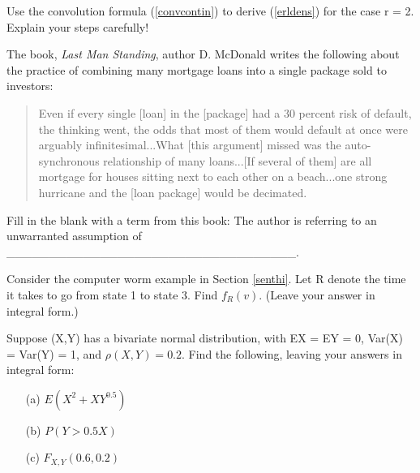 \oneproblem
Use the convolution formula (\ref{convcontin}) to derive (\ref{erldens})
for the case r = 2. Explain your steps carefully!

\oneproblem
The book, {\it Last Man Standing}, author D. McDonald writes
the following about the practice of combining many mortgage loans into a
single package sold to investors:

\begin{quote}
Even if every single [loan] in the [package] had a 30 percent risk of
default, the thinking went, the odds that most of them would default at
once were arguably infinitesimal...What [this argument] missed was the
auto-synchronous relationship of many loans...[If several of them] are
all mortgage for houses sitting next to each other on a beach...one
strong hurricane and the [loan package] would be decimated.
\end{quote}

Fill in the blank with a term from this book:  The author is referring
to an unwarranted assumption of
\_\_\_\_\_\_\_\_\_\_\_\_\_\_\_\_\_\_\_\_\_\_\_\_\_\_\_\_\_\_\_\_\_\_.

\oneproblem
Consider the computer worm example in Section \ref{senthi}.  Let R
denote the time it takes to go from state 1 to state 3.  Find $f_R(v)$.
(Leave your answer in integral form.)

\oneproblem
Suppose (X,Y) has a bivariate normal distribution, with EX = EY = 0,
Var(X) = Var(Y) = 1, and $\rho(X,Y) = 0.2$.  Find the following, leaving 
your answers in integral form:

\begin{itemize}

\item [(a)] $E(X^2+XY^{0.5})$

\item [(b)] $P(Y > 0.5X)$

\item [(c)] $F_{X,Y}(0.6,0.2)$

\end{itemize}

